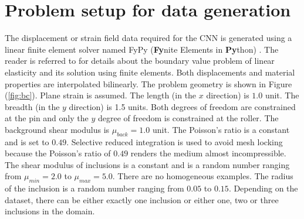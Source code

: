 \documentclass[12pt]{article}
\begin{document}
\section{\label{sect:probsetup}Problem setup for data generation}
The displacement or strain field data required for the CNN is generated using a linear finite element solver named FyPy (\textbf{Fy}nite Elements in \textbf{Py}thon) \cite{misc:fypy}. The reader is referred to \cite{book:hugheslinear,book:fishbelytschko,book:segelmathcont} for details about the boundary value problem of linear elasticity and its solution using finite elements. Both displacements and material properties are interpolated bilinearly. The problem geometry is shown in Figure (\ref{fig:bc}). Plane strain is assumed. The length (in the $x$ direction) is $1.0$ unit. The breadth (in the $y$ direction) is 1.5 units. Both degrees of freedom are constrained at the pin and only the $y$ degree of freedom is constrained at the roller. The background shear modulus is $\mu_{back}=1.0$ unit. The Poisson's ratio is a constant and is set to $0.49$. Selective reduced integration is used to avoid mesh locking because the Poisson's ratio of $0.49$ renders the medium almost incompressible. The shear modulus of inclusions is a constant and is a random number ranging from $\mu_{min}=2.0$ to $\mu_{max}=5.0$. There are no homogeneous examples. The radius of the inclusion is a random number ranging from $0.05$ to $0.15$. Depending on the dataset, there can be either exactly one inclusion or either one, two or three inclusions in the domain. 
\end{document}
